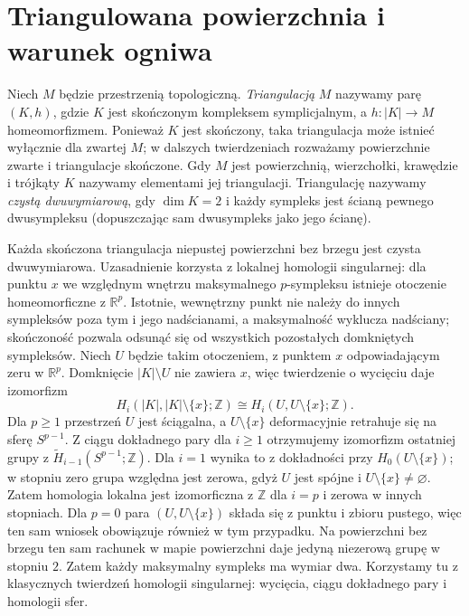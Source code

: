 \section{Triangulowana powierzchnia i warunek ogniwa}
\label{sec:tg-link-manifold}

\begin{definicja}[Triangulacja]
Niech $M$ będzie przestrzenią topologiczną. \emph{Triangulacją}
$M$ nazywamy parę $(K,h)$, gdzie $K$ jest skończonym
kompleksem symplicjalnym, a $h:|K|\to M$ homeomorfizmem.
Ponieważ $K$ jest skończony, taka triangulacja może istnieć
wyłącznie dla zwartej $M$; w dalszych twierdzeniach rozważamy
powierzchnie zwarte i triangulacje skończone. Gdy $M$ jest
powierzchnią, wierzchołki, krawędzie i trójkąty $K$ nazywamy
elementami jej triangulacji. Triangulację
nazywamy \emph{czystą dwuwymiarową}, gdy $\dim K=2$
i każdy sympleks jest ścianą pewnego dwusympleksu
(dopuszczając sam dwusympleks jako jego ścianę).
\end{definicja}

Każda skończona triangulacja niepustej powierzchni bez
brzegu jest czysta dwuwymiarowa. Uzasadnienie korzysta
z lokalnej homologii singularnej: dla punktu $x$
we względnym wnętrzu maksymalnego $p$-sympleksu istnieje
otoczenie homeomorficzne z $\mathbb R^p$. Istotnie,
wewnętrzny punkt nie należy do innych sympleksów poza
tym i jego nadścianami, a maksymalność wyklucza nadściany;
skończoność pozwala odsunąć się od wszystkich pozostałych
domkniętych sympleksów. Niech $U$ będzie takim otoczeniem, z punktem $x$
odpowiadającym zeru w $\mathbb R^p$.
Domknięcie $|K|\setminus U$ nie zawiera $x$,
więc twierdzenie o wycięciu daje izomorfizm
\[
H_i(|K|,|K|\setminus\{x\};\mathbb Z)
\cong H_i(U,U\setminus\{x\};\mathbb Z).
\]
Dla $p\ge1$ przestrzeń $U$ jest ściągalna, a
$U\setminus\{x\}$ deformacyjnie retrahuje się
na sferę $S^{p-1}$. Z ciągu dokładnego pary
dla $i\ge1$ otrzymujemy izomorfizm ostatniej grupy
z $\widetilde H_{i-1}(S^{p-1};\mathbb Z)$.
Dla $i=1$ wynika to z dokładności przy $H_0(U\setminus\{x\})$;
w stopniu zero grupa względna jest zerowa,
gdyż $U$ jest spójne i $U\setminus\{x\}\ne\varnothing$.
Zatem homologia lokalna jest izomorficzna z $\mathbb Z$
dla $i=p$ i zerowa w innych stopniach.
Dla $p=0$ para $(U,U\setminus\{x\})$ składa się
z punktu i zbioru pustego, więc ten sam wniosek
obowiązuje również w tym przypadku.
Na powierzchni bez brzegu ten sam rachunek w mapie
powierzchni daje jedyną niezerową grupę w stopniu $2$.
Zatem każdy maksymalny sympleks ma wymiar dwa.
Korzystamy tu z klasycznych twierdzeń homologii singularnej:
wycięcia, ciągu dokładnego pary i homologii sfer.

